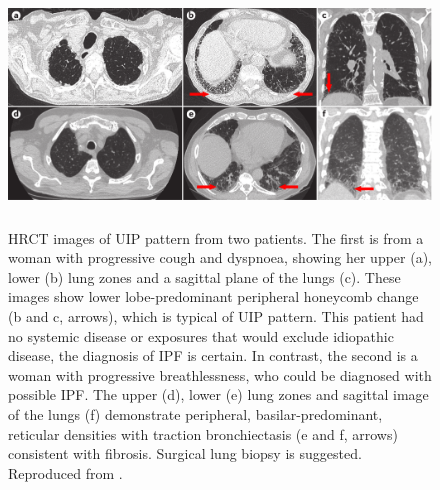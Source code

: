 \begin{figure}[H]
  \centering 
  \includegraphics[height=2.5in]{Background/Image/RadiologicalImaging.png}
  \caption{HRCT images of UIP pattern from two patients. The first is from a woman with progressive cough and dyspnoea, showing her upper (a), lower (b) lung zones and a sagittal plane of the lungs (c). These images show lower lobe-predominant peripheral honeycomb change (b and c, arrows), which is typical of UIP pattern. This patient had no systemic disease or exposures that would exclude idiopathic disease, the diagnosis of IPF is certain. In contrast, the second is a woman with progressive breathlessness, who could be diagnosed with possible IPF. The upper (d), lower (e) lung zones and sagittal image of the lungs (f) demonstrate peripheral, basilar-predominant, reticular densities with traction bronchiectasis (e and f, arrows) consistent with fibrosis. Surgical lung biopsy is suggested. Reproduced from \citep{martinez2017idiopathic}.}
  \label{fig:RadiologicalImaging}
\end{figure}


